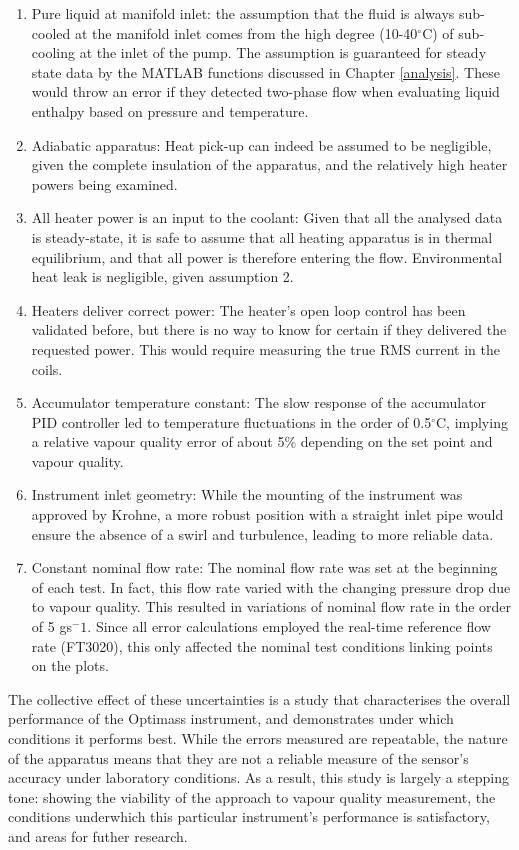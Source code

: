 \documentclass{report}
\begin{document}
\begin{enumerate}
\item{Pure liquid at manifold inlet: the assumption that the fluid is always sub-cooled at the manifold inlet comes from the high degree (10-40$^\circ$C) of sub-cooling at the inlet of the pump. The assumption is guaranteed for steady state data by the MATLAB functions discussed in Chapter \ref{analysis}. These would throw an error if they detected two-phase flow when evaluating liquid enthalpy based on pressure and temperature.}
\item{Adiabatic apparatus: Heat pick-up can indeed be assumed to be negligible, given the complete insulation of the apparatus, and the relatively high heater powers being examined.}
\item{All heater power is an input to the coolant: Given that all the analysed data is steady-state, it is safe to assume that all heating apparatus is in thermal equilibrium, and that all power is therefore entering the flow. Environmental heat leak is negligible, given assumption 2.}
\item{Heaters deliver correct power: The heater's open loop control has been validated before, but there is no way to know for certain if they delivered the requested power. This would require measuring the true RMS current in the coils.}
\item{Accumulator temperature constant: The slow response of the accumulator PID controller led to temperature fluctuations in the order of 0.5$^\circ$C, implying a relative vapour quality error of about 5\% depending on the set point and vapour quality.}
\item{Instrument inlet geometry: While the mounting of the instrument was approved by Krohne, a more robust position with a straight inlet pipe would ensure the absence of a swirl and turbulence, leading to more reliable data.}
\item{Constant nominal flow rate: The nominal flow rate was set at the beginning of each test. In fact, this flow rate varied with the changing pressure drop due to vapour quality. This resulted in variations of nominal flow rate in the order of 5 gs$^-1$. Since all error calculations employed the real-time reference flow rate (FT3020), this only affected the nominal test conditions linking points on the plots.}
\end{enumerate}
The collective effect of these uncertainties is a study that characterises the overall performance of the Optimass instrument, and demonstrates under which conditions it performs best. While the errors measured are repeatable, the nature of the apparatus means that they are not a reliable measure of the sensor's accuracy under laboratory conditions. As a result, this study is largely a stepping tone: showing the viability of the approach to vapour quality measurement, the conditions underwhich this particular instrument's performance is satisfactory, and areas for futher research.
\end{document}

